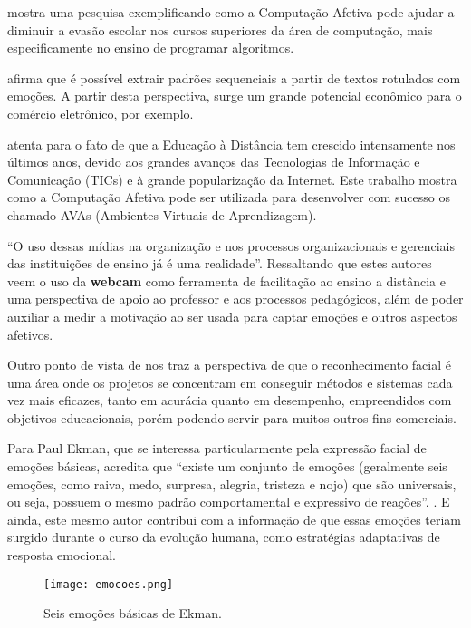 \documentclass[
    12pt,                   %
    openright,              %
    oneside,                %
    a4paper,                %
    sumario=tradicional,    %
    english,                %
    brazil,                 %
    ]{abntex2}
\begin{document}
 mostra uma pesquisa exemplificando como a Computação Afetiva pode ajudar a diminuir a evasão escolar nos cursos superiores da área de computação, mais especificamente no ensino de programar algoritmos.

 afirma que é possível extrair padrões sequenciais a partir de textos rotulados com emoções. A partir desta perspectiva, surge um grande potencial econômico para o comércio eletrônico, por exemplo.

 atenta para o fato de que a Educação à Distância tem crescido intensamente nos últimos anos, devido aos grandes avanços das Tecnologias de Informação e Comunicação (TICs) e à grande popularização da Internet. Este trabalho mostra como a Computação Afetiva pode ser utilizada para desenvolver com sucesso os chamado AVAs (Ambientes Virtuais de Aprendizagem).

``O uso dessas mídias na organização e nos processos organizacionais e gerenciais das instituições de ensino já é uma realidade''\cite{amorim2009}. Ressaltando que estes autores veem o uso da \textbf{webcam} como ferramenta de facilitação ao ensino a distância e uma perspectiva de apoio ao professor e aos processos pedagógicos, além de poder auxiliar a medir a motivação ao ser usada para captar emoções e outros aspectos afetivos.

Outro ponto de vista de  nos traz a perspectiva de que o reconhecimento facial é uma área onde os projetos se concentram em conseguir métodos e sistemas cada vez mais eficazes, tanto em acurácia quanto em desempenho, empreendidos com objetivos educacionais, porém podendo servir para muitos outros fins comerciais. 

Para  Paul Ekman, que se interessa particularmente pela expressão facial de emoções básicas, acredita que ``existe um conjunto de emoções (geralmente seis emoções, como raiva, medo, surpresa, alegria, tristeza e nojo) que são universais, ou seja, possuem o mesmo padrão comportamental e expressivo de reações''. . E ainda, este mesmo autor contribui com a informação de que essas emoções teriam surgido durante o curso da evolução humana, como estratégias adaptativas de resposta emocional.

\begin{figure}[htbp]
    \label{fig: Seis emoções básicas de Ekman} 
    \centering
    \texttt{[image: emocoes.png]} 
    \caption{Seis emoções básicas de Ekman.}
\end{figure}
\end{document}
